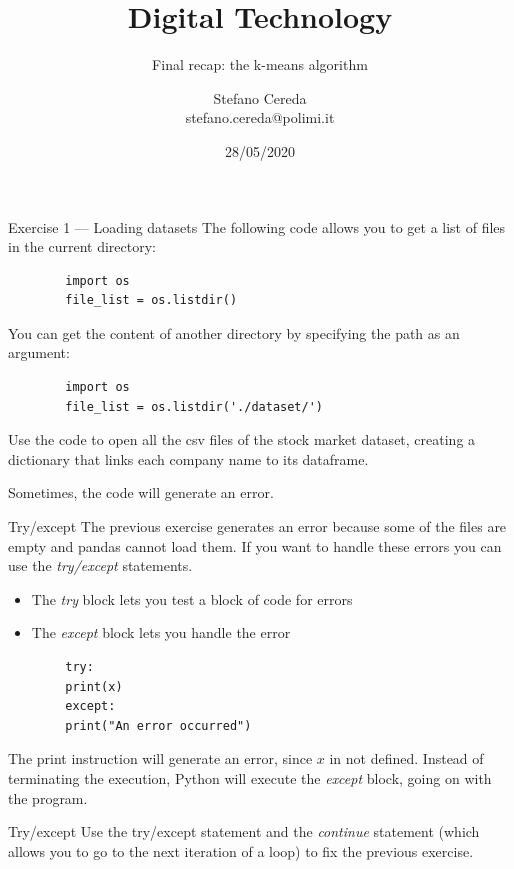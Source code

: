 \documentclass[aspectratio=169,]{beamer}
\title{Digital Technology}
\subtitle{Final recap: the k-means algorithm}
\author{Stefano Cereda\\
stefano.cereda@polimi.it
}
\date{28/05/2020}
\institute[PoliMi]{Politecnico Milano}
\begin{document}
\begin{frame}
    \maketitle
\end{frame}

\begin{frame}[fragile]{Exercise 1 --- Loading datasets}
    The following code allows you to get a list of files in the current directory:
    \begin{verbatim}
        import os
        file_list = os.listdir()
    \end{verbatim}

    You can get the content of another directory by specifying the path as an argument:
    \begin{verbatim}
        import os
        file_list = os.listdir('./dataset/')
    \end{verbatim}

    Use the code to open all the csv files of the stock market dataset, creating a dictionary that links each company
    name to its dataframe.

    \pause
    Sometimes, the code will generate an error.
\end{frame}

\begin{frame}[fragile]{Try/except}
    The previous exercise generates an error because some of the files are empty and pandas cannot load them.
    If you want to handle these errors you can use the \emph{try/except} statements.

    \begin{itemize}
        \item The \emph{try} block lets you test a block of code for errors
        \item The \emph{except} block lets you handle the error
    \end{itemize}

    \begin{verbatim}
        try:
        print(x)
        except:
        print("An error occurred")
    \end{verbatim}
    The print instruction will generate an error, since $x$ in not defined. Instead of terminating the execution, Python
    will execute the \emph{except} block, going on with the program.
\end{frame}

\begin{frame}{Try/except}
    Use the try/except statement and the \emph{continue} statement (which allows you to go to the next iteration of a loop) to fix
    the previous exercise.
\end{frame}
\end{document}
